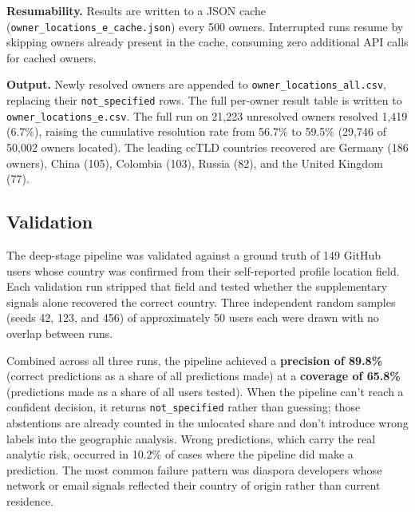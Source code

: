 \textbf{Resumability.} Results are written to a JSON cache (\texttt{owner\_locations\_e\_cache.json}) every 500 owners. Interrupted runs resume by skipping owners already present in the cache, consuming zero additional API calls for cached owners.

\textbf{Output.} Newly resolved owners are appended to \texttt{owner\_locations\_all.csv}, replacing their \texttt{not\_specified} rows. The full per-owner result table is written to \texttt{owner\_locations\_e.csv}. The full run on 21,223 unresolved owners resolved 1,419 (6.7\%), raising the cumulative resolution rate from 56.7\% to 59.5\% (29,746 of 50,002 owners located). The leading ccTLD countries recovered are Germany (186 owners), China (105), Colombia (103), Russia (82), and the United Kingdom (77).

\subsection{Validation}

The deep-stage pipeline was validated against a ground truth of 149 GitHub users whose country was confirmed from their self-reported profile location field. Each validation run stripped that field and tested whether the supplementary signals alone recovered the correct country. Three independent random samples (seeds 42, 123, and 456) of approximately 50 users each were drawn with no overlap between runs.

Combined across all three runs, the pipeline achieved a \textbf{precision of 89.8\%} (correct predictions as a share of all predictions made) at a \textbf{coverage of 65.8\%} (predictions made as a share of all users tested). When the pipeline can't reach a confident decision, it returns \texttt{not\_specified} rather than guessing; those abstentions are already counted in the unlocated share and don't introduce wrong labels into the geographic analysis. Wrong predictions, which carry the real analytic risk, occurred in 10.2\% of cases where the pipeline did make a prediction. The most common failure pattern was diaspora developers whose network or email signals reflected their country of origin rather than current residence.

